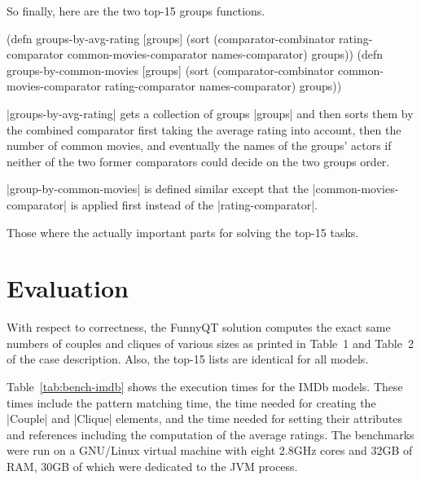 \documentclass[submission]{eptcs}
\newcommand{\code}{\clojureinline}
\begin{document}
So finally, here are the two top-15 groups functions.

\begin{clojurecode}
(defn groups-by-avg-rating [groups]
  (sort (comparator-combinator rating-comparator common-movies-comparator names-comparator) groups))
(defn groups-by-common-movies [groups]
  (sort (comparator-combinator common-movies-comparator rating-comparator names-comparator) groups))
\end{clojurecode}

\code|groups-by-avg-rating| gets a collection of groups \code|groups| and then
sorts them by the combined comparator first taking the average rating into
account, then the number of common movies, and eventually the names of the
groups' actors if neither of the two former comparators could decide on the two
groups order.

\code|group-by-common-movies| is defined similar except that the
\code|common-movies-comparator| is applied first instead of the
\code|rating-comparator|.

Those where the actually important parts for solving the top-15 tasks.


\section{Evaluation}
\label{sec:evaluation}

With respect to correctness, the FunnyQT solution computes the exact same
numbers of couples and cliques of various sizes as printed in Table~1 and
Table~2 of the case description.  Also, the top-15 lists are identical for all
models.

Table~\ref{tab:bench-imdb} shows the execution times for the IMDb models.
These times include the pattern matching time, the time needed for creating the
\code|Couple| and \code|Clique| elements, and the time needed for setting their
attributes and references including the computation of the average ratings.
The benchmarks were run on a GNU/Linux virtual machine with eight 2.8GHz cores
and 32GB of RAM, 30GB of which were dedicated to the JVM process.
\end{document}
